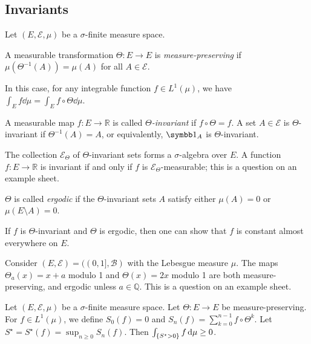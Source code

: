\subsection{Invariants}
Let \( (E, \mathcal E, \mu) \) be a \( \sigma \)-finite measure space.
\begin{definition}
	A measurable transformation \( \Theta \colon E \to E \) is \emph{measure-preserving} if \( \mu(\Theta^{-1}(A)) = \mu(A) \) for all \( A \in \mathcal E \).
\end{definition}
In this case, for any integrable function \( f \in L^1(\mu) \), we have \( \int_E f \dd{\mu} = \int_E f \circ \Theta \dd{\mu} \).
\begin{definition}
	A measurable map \( f \colon E \to \mathbb R \) is called \emph{\( \Theta \)-invariant} if \( f \circ \Theta = f \).
	A set \( A \in \mathcal E \) is \( \Theta \)-invariant if \( \Theta^{-1}(A) = A \), or equivalently, \( \symbb 1_A \) is \( \Theta \)-invariant.
\end{definition}
The collection \( \mathcal E_\Theta \) of \( \Theta \)-invariant sets forms a \( \sigma \)-algebra over \( E \).
A function \( f \colon E \to \mathbb R \) is invariant if and only if \( f \) is \( \mathcal E_\Theta \)-measurable; this is a question on an example sheet.
\begin{definition}
	\( \Theta \) is called \emph{ergodic} if the \( \Theta \)-invariant sets \( A \) satisfy either \( \mu(A) = 0 \) or \( \mu(E \setminus A) = 0 \).
\end{definition}
If \( f \) is \( \Theta \)-invariant and \( \Theta \) is ergodic, then one can show that \( f \) is constant almost everywhere on \( E \).
\begin{example}
	Consider \( (E, \mathcal E) = ((0,1], \mathcal B) \) with the Lebesgue measure \( \mu \).
	The maps \( \Theta_a(x) = x + a \) modulo 1 and \( \Theta(x) = 2x \) modulo 1 are both measure-preserving, and ergodic unless \( a \in \mathbb Q \).
	This is a question on an example sheet.
\end{example}
\begin{lemma}
    Let \( (E, \mathcal E, \mu) \) be a \( \sigma \)-finite measure space.
	Let \( \Theta \colon E \to E \) be measure-preserving.
	For \( f \in L^1(\mu) \), we define \( S_0(f) = 0 \) and \( S_n(f) = \sum_{k=0}^{n-1} f \circ \Theta^k \).
    Let \( S^\star = S^\star(f) = \sup_{n \geq 0} S_n(f) \).
    Then \( \int_{\qty{S^\star > 0}} f \dd{\mu} \geq 0 \).
\end{lemma}
